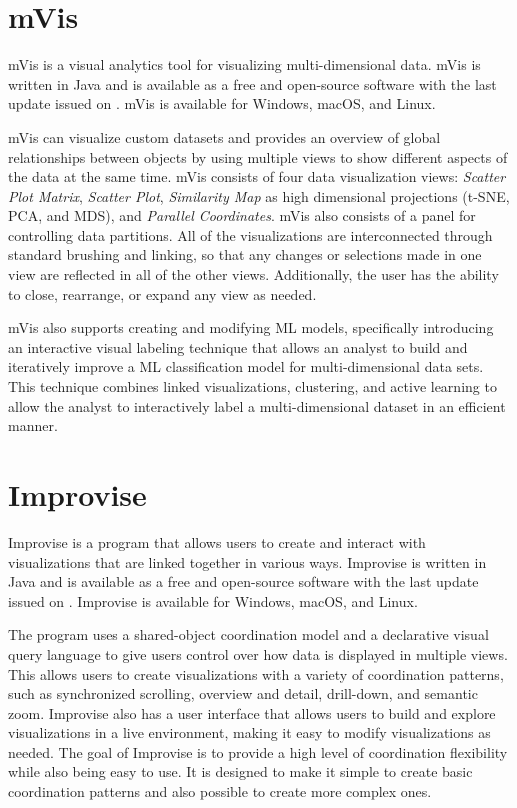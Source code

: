 \section{mVis}

mVis \parencite{CHEGINI20199} is a visual analytics tool for
visualizing multi-dimensional data. mVis is written in Java and is
available as a free and open-source software with the last update
issued on . mVis is available for Windows, 
macOS, and Linux.

mVis can visualize custom datasets and provides an overview of global
relationships between objects by using multiple views to show
different aspects of the data at the same time. mVis consists of four
data visualization views: \emph{Scatter Plot Matrix}, \emph{Scatter
Plot}, \emph{Similarity Map} as high dimensional projections (t-SNE,
PCA, and MDS), and \emph{Parallel Coordinates}. mVis also consists of
a panel for controlling data partitions. All of the visualizations are
interconnected through standard brushing and linking, so that any
changes or selections made in one view are reflected in all of the
other views. Additionally, the user has the ability to close,
rearrange, or expand any view as needed.

mVis also supports creating and modifying ML models, specifically
introducing an interactive visual labeling technique that allows an
analyst to build and iteratively improve a ML classification model for
multi-dimensional data sets. This technique combines linked
visualizations, clustering, and active learning to allow the analyst
to interactively label a multi-dimensional dataset in an efficient
manner.



\section{Improvise}

Improvise \parencite{Improvise} is a program that allows users to
create and interact with visualizations that are linked together in
various ways. Improvise is written in Java and is available as a free
and open-source software with the last update issued on 
. Improvise is available for Windows, 
macOS, and Linux.

The program uses a shared-object coordination model and a declarative
visual query language to give users control over how data is displayed
in multiple views. This allows users to create visualizations with a
variety of coordination patterns, such as synchronized scrolling,
overview and detail, drill-down, and semantic zoom. Improvise also has
a user interface that allows users to build and explore visualizations
in a live environment, making it easy to modify visualizations as
needed. The goal of Improvise is to provide a high level of
coordination flexibility while also being easy to use. It is designed
to make it simple to create basic coordination patterns and also
possible to create more complex ones.




